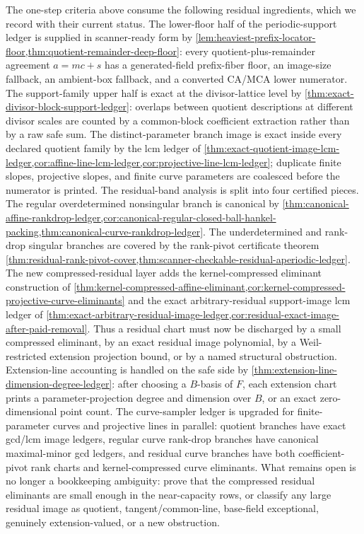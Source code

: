\documentclass[11pt]{article}
\theoremstyle{definition}
\theoremstyle{remark}
\begin{document}
The one-step criteria above consume the following residual ingredients, which we
record with their current status.  The lower-floor half of the periodic-support
ledger is supplied in scanner-ready form by
\cref{lem:heaviest-prefix-locator-floor,thm:quotient-remainder-deep-floor}: every
quotient-plus-remainder agreement $a=mc+s$ has a generated-field prefix-fiber
floor, an image-size fallback, an ambient-box fallback, and a converted CA/MCA
lower numerator.  The support-family upper half is exact at the divisor-lattice
level by \cref{thm:exact-divisor-block-support-ledger}: overlaps between quotient
descriptions at different divisor scales are counted by a common-block
coefficient extraction rather than by a raw safe sum.  The distinct-parameter
branch image is exact inside every declared quotient family by the lcm ledger of
\cref{thm:exact-quotient-image-lcm-ledger,cor:affine-line-lcm-ledger,cor:projective-line-lcm-ledger}; duplicate finite slopes, projective slopes, and
finite curve parameters are coalesced before the numerator is printed.  The
residual-band analysis is split into four certified pieces.  The regular overdetermined nonsingular branch
is canonical by \cref{thm:canonical-affine-rankdrop-ledger,cor:canonical-regular-closed-ball-hankel-packing,thm:canonical-curve-rankdrop-ledger}.  The underdetermined
and rank-drop singular branches are covered by the rank-pivot certificate theorem
\cref{thm:residual-rank-pivot-cover,thm:scanner-checkable-residual-aperiodic-ledger}.  The new compressed-residual layer adds the kernel-compressed eliminant construction of
\cref{thm:kernel-compressed-affine-eliminant,cor:kernel-compressed-projective-curve-eliminants} and the exact arbitrary-residual support-image lcm ledger of
\cref{thm:exact-arbitrary-residual-image-ledger,cor:residual-exact-image-after-paid-removal}.  Thus a residual chart must now be discharged by a small compressed
eliminant, by an exact residual image polynomial, by a Weil-restricted extension
projection bound, or by a named structural obstruction.  Extension-line
accounting is handled on the safe side by
\cref{thm:extension-line-dimension-degree-ledger}: after choosing a $B$-basis of
$F$, each extension chart prints a parameter-projection degree and dimension over
$B$, or an exact zero-dimensional point count.  The curve-sampler ledger is
upgraded for finite-parameter curves and projective lines in parallel: quotient branches have exact gcd/lcm
image ledgers, regular curve rank-drop branches have canonical maximal-minor gcd
ledgers, and residual curve branches have both coefficient-pivot rank charts and
kernel-compressed curve eliminants.  What remains open is no longer a bookkeeping
ambiguity: prove that the compressed residual eliminants are small enough in the
near-capacity rows, or classify any large residual image as quotient,
tangent/common-line, base-field exceptional, genuinely extension-valued, or a new
obstruction.
\end{document}
